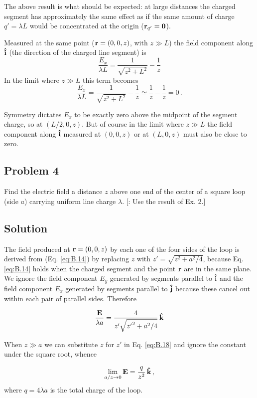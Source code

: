 The above result is what should be expected: at large distances the charged segment has approximately the same effect as if the same amount of charge $q'=\lambda L$ would be concentrated at the origin ($\vb{r}_{q'} = \vb{0}$). 

Measured at the same point ($\vb{r} = (0,0,z)$, with $z \gg L$) the field component along $\vu{i}$ (the direction of the charged line segment) is 
$$\frac{E_x}{\lambda L} = \frac{1}{\sqrt{z^2 + L^2}} - \frac{1}{z}$$
In the limit where $z \gg L$ this term becomes 
$$\frac{E_x}{\lambda L} = \frac{1}{\sqrt{z^2 + L^2}} - \frac{1}{z}  \simeq \frac{1}{z} - \frac{1}{z} = 0\,.$$

Symmetry dictates $E_x$ to be exactly zero above the midpoint  of the segment charge, so at $(L/2,0,z)$. 
But of course in the limit where  $z \gg L$ the field component along $\vu{i}$ measured at $(0,0,z)$ or at $(L,0,z)$ must also be close to zero.

\subsection*{Problem 4}
Find the electric field a distance $z$ above one end of the center of a square loop (side $a$) carrying uniform line charge $\lambda$. [: Use the result of  Ex. 2.]

\subsection*{Solution}

The field produced at $\vb{r} = (0, 0, z)$ by each one of the four sides of the loop is derived from (Eq. \ref{eq:B.14}) by replacing  $z$ with $z' = \sqrt{z^2 + a^2/4}$, because Eq. \ref{eq:B.14} holds when the charged segment and the point  $\vb{r}$ are in the same plane. 
We ignore the field component $E_y$ generated by segments parallel to $\vu{i}$ and the field component $E_x$ generated by segments parallel to $\vu{j}$ because these cancel out within each pair of parallel sides. Therefore 

\begin{equation}\label{eq:B.18}
\frac{\vb{E}}{\lambda a} = \frac{4}{z' \sqrt{{z'}^2 + a^2/4}}\,\vu{k}
\end{equation}

When $z \gg a$ we can substitute $z$ for $z'$ in Eq. \ref{eq:B.18} and ignore the constant under the square root, whence

\begin{equation}\label{eq:B.19}
\lim_{a/z \rightarrow 0} \vb{E} = \frac{q}{z^2}\,  \vu{k}\,,  
\end{equation}
where $q = 4 \lambda a$ is the total charge of the loop.  

